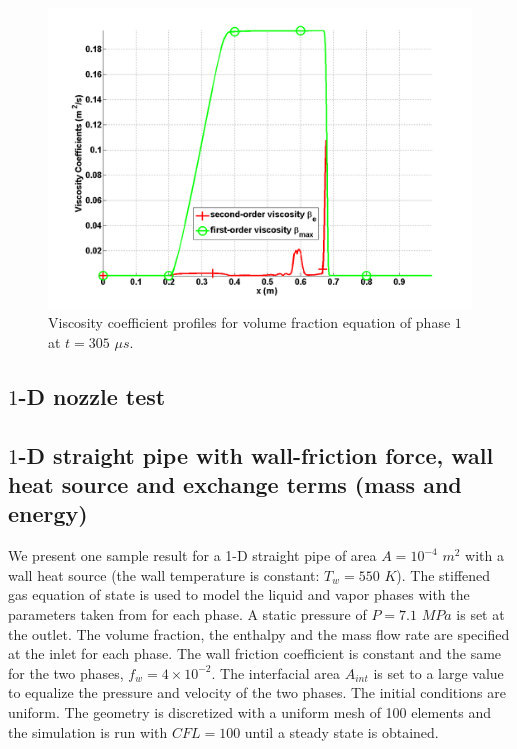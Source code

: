 \begin{figure}[H]
\centering
\includegraphics[width=\textwidth]{figures/relaxation_two_phases_liquid_beta.png}
\caption{Viscosity coefficient profiles for volume fraction equation of phase $1$ at $t=305$ $\mu s$.}
\label{fig:two-fluids-rel-vf-visc-1-7-eqn-sect4}
\end{figure}
%
\subsection{$1$-D nozzle test}\label{sec:1d-nozzle-rel-7-eq-sct4}
\subsection{$1$-D straight pipe with wall-friction force, wall heat source and exchange terms (mass and energy)}\label{sec:1d-straight-pipe-7-eq-sct4}
We present one sample result for a 1-D straight pipe of area $A = 10^{-4}$ $m^2$ with a wall heat source (the wall temperature is constant: $T_w = 550$ $K$). The stiffened gas equation of state is used to model the liquid and vapor phases with the parameters taken from \cite{SGEOS} for each phase. A static pressure of $P=7.1$ $MPa$ is set at the outlet. The volume fraction, the enthalpy and the mass flow rate are specified at the inlet for each phase. The wall friction coefficient is constant and the same for the two phases, $f_w = 4 \times 10^{-2}$. The interfacial area $A_{int}$ is set to a large value to equalize the pressure and velocity of the two phases. The initial conditions are uniform. The geometry is discretized with a uniform mesh of 100 elements and the simulation is run with $CFL=100$  until a steady state is obtained. 

